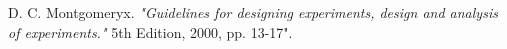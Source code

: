 \begin{thebibliography}{9}
D. C. Montgomeryx.
\textit{"Guidelines for designing experiments, design and analysis of experiments."} 5th Edition, 2000, pp. 13-17".
\end{thebibliography}
